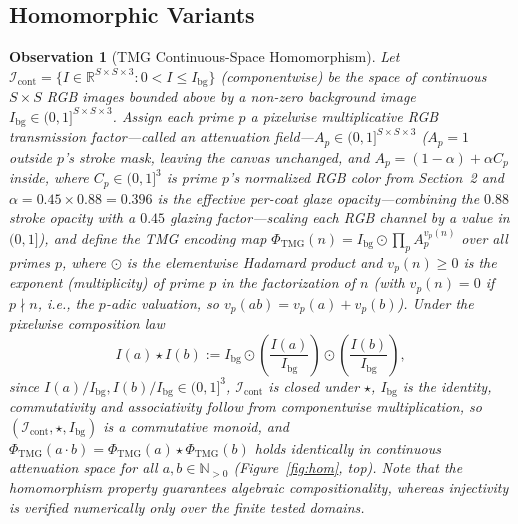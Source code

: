 \documentclass[]{interact}
\theoremstyle{plain}
\newtheorem{observation}[theorem]{Observation}
\theoremstyle{definition}
\theoremstyle{remark}
\begin{document}
\subsection{Homomorphic Variants}
\begin{observation}[TMG Continuous-Space Homomorphism]
Let $\mathcal{I}_{\mathrm{cont}} = \{I \in \mathbb{R}^{S \times S \times 3} : 0 < I \le I_{\mathrm{bg}}\}$ (componentwise) be the space of continuous $S \times S$ RGB images bounded above by a non-zero background image $I_{\mathrm{bg}} \in (0, 1]^{S \times S \times 3}$. Assign each prime $p$ a pixelwise multiplicative RGB transmission factor—called an \emph{attenuation field}—$A_p \in (0, 1]^{S \times S \times 3}$ ($A_p = 1$ outside $p$'s stroke mask, leaving the canvas unchanged, and $A_p = (1 - \alpha) + \alpha C_p$ inside, where $C_p \in (0, 1]^3$ is prime $p$'s normalized RGB color from Section~2 and $\alpha = 0.45 \times 0.88 = 0.396$ is the effective per-coat glaze opacity—combining the $0.88$ stroke opacity with a $0.45$ glazing factor—scaling each RGB channel by a value in $(0, 1]$), and define the \emph{TMG encoding map} $\Phi_{\mathrm{TMG}}(n) = I_{\mathrm{bg}} \odot \prod_p A_p^{v_p(n)}$ over all primes $p$, where $\odot$ is the elementwise Hadamard product and $v_p(n) \ge 0$ is the exponent (multiplicity) of prime $p$ in the factorization of $n$ (with $v_p(n) = 0$ if $p \nmid n$, i.e., the $p$-adic valuation, so $v_p(ab) = v_p(a) + v_p(b)$). Under the pixelwise composition law
\begin{equation}
  I(a) \star I(b) := I_{\mathrm{bg}} \odot \left(\frac{I(a)}{I_{\mathrm{bg}}}\right) \odot \left(\frac{I(b)}{I_{\mathrm{bg}}}\right),
\end{equation}
since $I(a)/I_{\mathrm{bg}}, I(b)/I_{\mathrm{bg}} \in (0, 1]^3$, $\mathcal{I}_{\mathrm{cont}}$ is closed under $\star$, $I_{\mathrm{bg}}$ is the identity, commutativity and associativity follow from componentwise multiplication, so $(\mathcal{I}_{\mathrm{cont}}, \star, I_{\mathrm{bg}})$ is a commutative monoid, and $\Phi_{\mathrm{TMG}}(a \cdot b) = \Phi_{\mathrm{TMG}}(a) \star \Phi_{\mathrm{TMG}}(b)$ holds identically in continuous attenuation space for all $a, b \in \mathbb{N}_{>0}$ (Figure~\ref{fig:hom}, top). Note that the homomorphism property guarantees algebraic compositionality, whereas injectivity is verified numerically only over the finite tested domains.
\end{observation}
\end{document}
